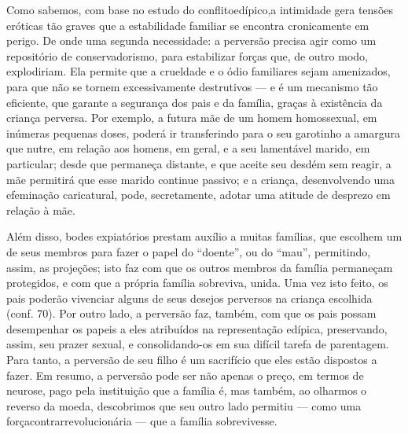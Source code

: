 Como sabemos, com base no estudo do conflito\idxconfe[|(] edípico,\idxheteroconf[|(] a intimidade\idxintim{}
gera tensões\idxpervtecni{} eróticas tão graves que a estabilidade familiar se
encontra cronicamente em perigo. De onde uma segunda necessidade: a
perversão precisa agir como um repositório de conservadorismo, para
estabilizar forças que, de outro modo, explodiriam. Ela permite que a
crueldade e o ódio familiares sejam amenizados, para que não se tornem
excessivamente destrutivos --- e é um mecanismo tão eficiente, que
garante a segurança dos pais e da família, graças à existência da
criança perversa. Por exemplo, a futura mãe de um homem homossexual, em
inúmeras pequenas doses, poderá ir transferindo para o seu garotinho a
amargura que nutre, em relação aos homens, em geral, e a seu
lamentável marido, em particular; desde que permaneça distante, e que
aceite seu desdém sem reagir, a mãe permitirá que esse marido continue
passivo; e a criança, desenvolvendo uma efeminação caricatural, pode,
secretamente, adotar uma atitude de desprezo em relação à mãe.

Além disso, bodes\idxbodex{} expiatórios\idxpervaspec{} prestam auxílio a muitas famílias, que
escolhem um de seus membros para fazer o papel do
``doente'', ou do
``mau'', permitindo, assim, as projeções;\idxpervpecad{}
isto faz com que os outros membros da família permaneçam protegidos, e
com que a própria família sobreviva, unida. Uma vez isto feito, os pais
poderão vivenciar alguns de seus desejos perversos na criança escolhida
(conf. 70). Por outro lado, a perversão faz, também, com que os pais
possam desempenhar os papeis a eles atribuídos na representação
edípica, preservando, assim, seu prazer sexual, e consolidando-os em
sua difícil tarefa de parentagem. Para tanto, a perversão de seu filho
é um sacrifício que eles estão dispostos a fazer. Em resumo, a
perversão pode ser não apenas o preço, em termos de neurose, pago pela
instituição que a família é, mas também, ao olharmos o reverso da
moeda, descobrimos que seu outro lado permitiu --- como uma força\idxrelpc[|)]
contrarrevolucionária --- que a família sobrevivesse.

